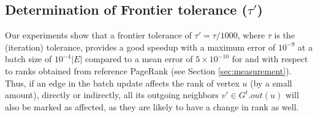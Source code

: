 \subsection{Determination of Frontier tolerance ($\tau'$)}

Our experiments show that a frontier tolerance of $\tau' = \tau/1000$, where $\tau$ is the (iteration) tolerance, provides a good speedup with a maximum error of $10^{-9}$ at a batch size of $10^{-4} |E|$ compared to a mean error of $5 \times 10^{-10}$ for \NaiWbar{} and \NaiBarf{} with respect to ranks obtained from reference PageRank (see Section \ref{sec:measurement}). Thus, if an edge in the batch update affects the rank of vertex $u$ (by a small amount), directly or indirectly, all its outgoing neighbors $v' \in G^t.out(u)$ will also be marked as affected, as they are likely to have a change in rank as well.







